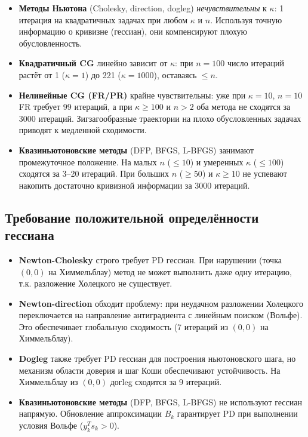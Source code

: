 \documentclass[12pt]{article}
\begin{document}
\begin{itemize}
    \item \textbf{Методы Ньютона} (Cholesky, direction, dogleg) \textit{нечувствительны} к $\kappa$: 1 итерация на квадратичных задачах при любом $\kappa$ и $n$. Используя точную информацию о кривизне (гессиан), они компенсируют плохую обусловленность.

    \item \textbf{Квадратичный CG} линейно зависит от $\kappa$: при $n=100$ число итераций растёт от 1 ($\kappa=1$) до 221 ($\kappa=1000$), оставаясь $\leq n$.

    \item \textbf{Нелинейные CG (FR/PR)} крайне чувствительны: уже при $\kappa=10$, $n=10$ FR требует 99 итераций, а при $\kappa \geq 100$ и $n > 2$ оба метода не сходятся за 3000 итераций. Зигзагообразные траектории на плохо обусловленных задачах приводят к медленной сходимости.

    \item \textbf{Квазиньютоновские методы} (DFP, BFGS, L-BFGS) занимают промежуточное положение. На малых $n$ ($\leq 10$) и умеренных $\kappa$ ($\leq 100$) сходятся за 3--20 итераций. При больших $n$ ($\geq 50$) и $\kappa \geq 10$ не успевают накопить достаточно кривизной информации за 3000 итераций.
\end{itemize}

\subsection*{Требование положительной определённости гессиана}

\begin{itemize}
    \item \textbf{Newton-Cholesky} строго требует PD гессиан. При нарушении (точка $(0,0)$ на Химмельблау) метод не может выполнить даже одну итерацию, т.к. разложение Холецкого не существует.

    \item \textbf{Newton-direction} обходит проблему: при неудачном разложении Холецкого переключается на направление антиградиента с линейным поиском (Вольфе). Это обеспечивает глобальную сходимость (7 итераций из $(0,0)$ на Химмельблау).

    \item \textbf{Dogleg} также требует PD гессиан для построения ньютоновского шага, но механизм области доверия и шаг Коши обеспечивают устойчивость. На Химмельблау из $(0,0)$ догleg сходится за 9 итераций.

    \item \textbf{Квазиньютоновские методы} (DFP, BFGS, L-BFGS) не используют гессиан напрямую. Обновление аппроксимации $B_k$ гарантирует PD при выполнении условия Вольфе ($y_k^T s_k > 0$).
\end{itemize}
\end{document}
